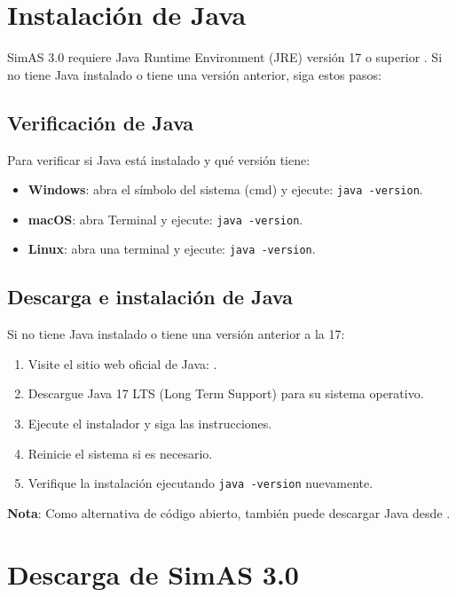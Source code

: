 \section{Instalación de Java}

SimAS 3.0 requiere Java Runtime Environment (JRE) versión 17 o superior \cite{java}. Si no tiene Java instalado o tiene una versión anterior, siga estos pasos:

\subsection{Verificación de Java}

Para verificar si Java está instalado y qué versión tiene:

\begin{itemize}
    \item \textbf{Windows}: abra el símbolo del sistema (cmd) y ejecute: \texttt{java -version}.
    \item \textbf{macOS}: abra Terminal y ejecute: \texttt{java -version}.
    \item \textbf{Linux}: abra una terminal y ejecute: \texttt{java -version}.
\end{itemize}

\subsection{Descarga e instalación de Java}

Si no tiene Java instalado o tiene una versión anterior a la 17:

\begin{enumerate}
    \item Visite el sitio web oficial de Java: \cite{java}.
    \item Descargue Java 17 LTS (Long Term Support) para su sistema operativo.
    \item Ejecute el instalador y siga las instrucciones.
    \item Reinicie el sistema si es necesario.
    \item Verifique la instalación ejecutando \texttt{java -version} nuevamente.
\end{enumerate}

\textbf{Nota}: Como alternativa de código abierto, también puede descargar Java desde \cite{adoptium}.

\section{Descarga de SimAS 3.0}

